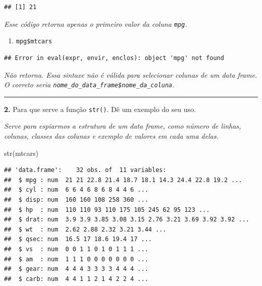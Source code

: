 \documentclass[
]{book}
\newenvironment{Shaded}{\begin{snugshade}}{\end{snugshade}}
\newcommand{\FunctionTok}[1]{\textcolor[rgb]{0.00,0.00,0.00}{#1}}
\newcommand{\NormalTok}[1]{#1}
\newcommand{\SpecialCharTok}[1]{\textcolor[rgb]{0.00,0.00,0.00}{#1}}
\providecommand{\tightlist}{%
  \setlength{\itemsep}{0pt}\setlength{\parskip}{0pt}}
\begin{document}
\begin{verbatim}
## [1] 21
\end{verbatim}

\emph{Esse código retorna apenas o primeiro valor da coluna \texttt{mpg}.}

\begin{enumerate}
\def\labelenumi{\alph{enumi}.}
\setcounter{enumi}{7}
\tightlist
\item
  \texttt{mpg\$mtcars}
\end{enumerate}

\begin{Shaded}
\end{Shaded}

\begin{verbatim}
## Error in eval(expr, envir, enclos): object 'mpg' not found
\end{verbatim}

\emph{Não retorna. Essa sintaxe não é válida para selecionar colunas de um data frame. O correto seria \texttt{nome\_do\_data\_frame\$nome\_da\_coluna}.}

\begin{center}\rule{0.5\linewidth}{0.5pt}\end{center}

\textbf{2.} Para que serve a função \texttt{str()}. Dê um exemplo do seu uso.

\emph{Serve para espiarmos a estrutura de um data frame, como número de linhas, colunas, classes das colunas e exemplo de valores em cada uma delas.}

\begin{Shaded}
\begin{Highlighting}[]
\FunctionTok{str}\NormalTok{(mtcars)}
\end{Highlighting}
\end{Shaded}

\begin{verbatim}
## 'data.frame':    32 obs. of  11 variables:
##  $ mpg : num  21 21 22.8 21.4 18.7 18.1 14.3 24.4 22.8 19.2 ...
##  $ cyl : num  6 6 4 6 8 6 8 4 4 6 ...
##  $ disp: num  160 160 108 258 360 ...
##  $ hp  : num  110 110 93 110 175 105 245 62 95 123 ...
##  $ drat: num  3.9 3.9 3.85 3.08 3.15 2.76 3.21 3.69 3.92 3.92 ...
##  $ wt  : num  2.62 2.88 2.32 3.21 3.44 ...
##  $ qsec: num  16.5 17 18.6 19.4 17 ...
##  $ vs  : num  0 0 1 1 0 1 0 1 1 1 ...
##  $ am  : num  1 1 1 0 0 0 0 0 0 0 ...
##  $ gear: num  4 4 4 3 3 3 3 4 4 4 ...
##  $ carb: num  4 4 1 1 2 1 4 2 2 4 ...
\end{verbatim}
\end{document}
